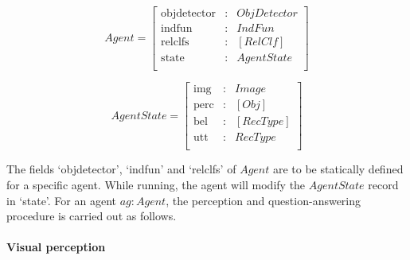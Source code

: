 \begin{equation}\label{eq:agent}
Agent = \left[\begin{array}{rcl}
    \text{objdetector} &:& ObjDetector \\
    \text{indfun} &:& IndFun \\
    \text{relclfs} &:& [RelClf] \\
    \text{state} &:& AgentState \\
    \end{array}\right]
\end{equation}

\begin{equation}\label{eq:state}
AgentState = \left[\begin{array}{rcl}
    \text{img} &:& Image \\
    \text{perc} &:& [Obj] \\
    \text{bel} &:& [RecType] \\
    \text{utt} &:& RecType \\
    \end{array}\right]
\end{equation}

The fields `objdetector', `indfun' and `relclfs' of $Agent$ are to be statically defined for a specific agent.
While running, the agent will modify the $AgentState$ record in `state'.
For an agent $ag : Agent$, the perception and question-answering procedure is carried out as follows.

\paragraph{Visual perception}

